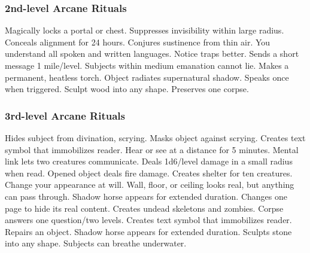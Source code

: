\subsubsection{2nd-level Arcane Rituals}
\begin{rituallist}
     Magically locks a portal or chest.
     Suppresses invisibility within large radius.
     Conceals alignment for 24 hours.
     Conjures sustinence from thin air.
     You understand all spoken and written languages.
     Notice traps better.
     Sends a short message 1 mile/level.
     Subjects within medium emanation cannot lie.
     Makes a permanent, heatless torch.
     Object radiates supernatural shadow.
     Speaks once when triggered.
     Sculpt wood into any shape.
     Preserves one corpse.
\end{rituallist}

\subsubsection{3rd-level Arcane Rituals}
\begin{rituallist}
     Hides subject from divination, scrying.
     Masks object against scrying.
     Creates text symbol that immobilizes reader.
     Hear or see at a distance for 5 minutes.
     Mental link lets two creatures communicate.
     Deals 1d6/level damage in a small radius when read.
     Opened object deals fire damage.
     Creates shelter for ten creatures.
     Change your appearance at will.
     Wall, floor, or ceiling looks real, but anything can pass through.
     Shadow horse appears for extended duration.
     Changes one page to hide its real content.
     Creates undead skeletons and zombies.
     Corpse answers one question/two levels.
     Creates text symbol that immobilizes reader.
     Repairs an object.
     Shadow horse appears for extended duration.
     Sculpts stone into any shape.
     Subjects can breathe underwater.
\end{rituallist}

